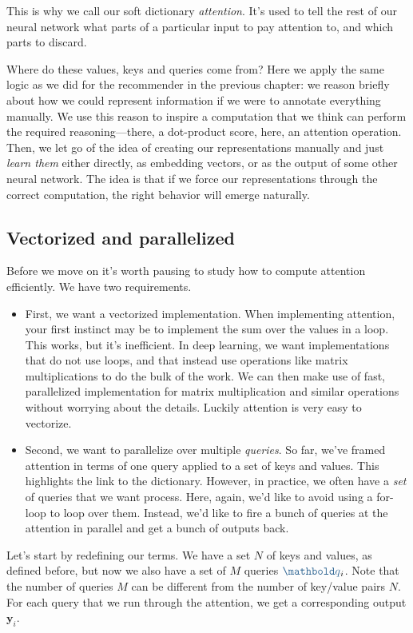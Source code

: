 \documentclass{pca}
\newcommand{\bc}[1]{{\color{my-blue} #1}}
\newcommand{\mbq}{\mathbold q}
\newcommand{\mby}{\mathbold y}
\theoremstyle{theorem}
\theoremstyle{definition}
\theoremstyle{proof}
\begin{document}
This is why we call our soft dictionary \emph{attention}. It's used to tell the rest of our neural network what parts of a particular input to pay attention to, and which parts to discard. 

Where do these values, keys and queries come from? Here we apply the same logic as we did for the recommender in the previous chapter: we reason briefly about how we could represent information if we were to annotate everything manually. We use this reason to inspire a computation that we think can perform the required reasoning---there, a dot-product score, here, an attention operation. Then, we let go of the idea of creating our representations manually and just \emph{learn them} either directly, as embedding vectors, or as the output of some other neural network. The idea is that if we force our representations through the correct computation, the right behavior will emerge naturally.

\subsection{Vectorized and parallelized}

Before we move on it's worth pausing to study how to compute attention efficiently. We have two requirements.
\begin{itemize}
	\item First, we want a vectorized implementation. When implementing attention, your first instinct may be to implement the sum over the values in a loop. This works, but it's inefficient. In deep learning, we want implementations that do not use loops, and that instead use operations like matrix multiplications to do the bulk of the work. We can then make use of fast, parallelized implementation for matrix multiplication and similar operations without worrying about the details. Luckily attention is very easy to vectorize.
	\item Second, we want to parallelize over multiple \emph{queries}. So far, we've framed attention in terms of one query applied to a set of keys and values. This highlights the link to the dictionary. However, in practice, we often have a \emph{set} of queries that we want process. Here, again, we'd like to avoid using a for-loop to loop over them. Instead, we'd like to fire a bunch of queries at the attention in parallel and get a bunch of outputs back.
\end{itemize}

Let's start by redefining our terms. We have a set $N$ of keys and values, as defined before, but now we also have a set of $M$ queries $\bc{\mbq}_i$. Note that the number of queries $M$ can be different from the number of key/value pairs $N$. For each query that we run through the attention, we get a corresponding output $\mby_i$. 
\end{document}
